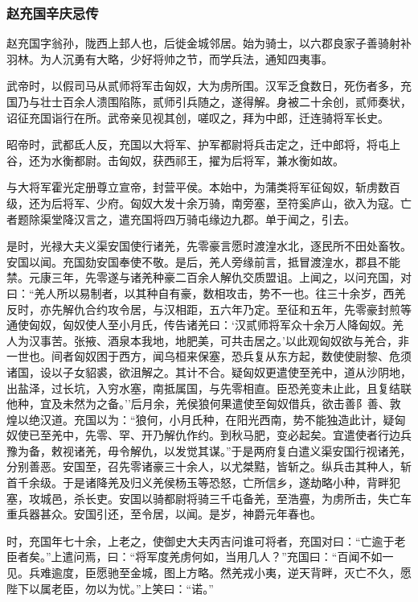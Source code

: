 \documentclass[]{article}
\begin{document}
\hypertarget{header-n5083}{%
\subsubsection{赵充国辛庆忌传}\label{header-n5083}}

赵充国字翁孙，陇西上邽人也，后徙金城邻居。始为骑士，以六郡良家子善骑射补羽林。为人沉勇有大略，少好将帅之节，而学兵法，通知四夷事。

武帝时，以假司马从贰师将军击匈奴，大为虏所围。汉军乏食数日，死伤者多，充国乃与壮士百余人溃围陷陈，贰师引兵随之，遂得解。身被二十余创，贰师奏状，诏征充国诣行在所。武帝亲见视其创，嗟叹之，拜为中郎，迁连骑将军长史。

昭帝时，武都氐人反，充国以大将军、护军都尉将兵击定之，迁中郎将，将屯上谷，还为水衡都尉。击匈奴，获西祁王，擢为后将军，兼水衡如故。

与大将军霍光定册尊立宣帝，封营平侯。本始中，为蒲类将军征匈奴，斩虏数百级，还为后将军、少府。匈奴大发十余万骑，南旁塞，至符奚庐山，欲入为寇。亡者题除渠堂降汉言之，遣充国将四万骑屯缘边九郡。单于闻之，引去。

是时，光禄大夫义渠安国使行诸羌，先零豪言愿时渡湟水北，逐民所不田处畜牧。安国以闻。充国劾安国奉使不敬。是后，羌人旁缘前言，抵冒渡湟水，郡县不能禁。元康三年，先零遂与诸羌种豪二百余人解仇交质盟诅。上闻之，以问充国，对曰：``羌人所以易制者，以其种自有豪，数相攻击，势不一也。往三十余岁，西羌反时，亦先解仇合约攻令居，与汉相距，五六年乃定。至征和五年，先零豪封煎等通使匈奴，匈奴使人至小月氏，传告诸羌曰：`汉贰师将军众十余万人降匈奴。羌人为汉事苦。张掖、酒泉本我地，地肥美，可共击居之。'以此观匈奴欲与羌合，非一世也。间者匈奴困于西方，闻乌桓来保塞，恐兵复从东方起，数使使尉黎、危须诸国，设以子女貂裘，欲沮解之。其计不合。疑匈奴更遣使至羌中，道从沙阴地，出盐泽，过长坑，入穷水塞，南抵属国，与先零相直。臣恐羌变未止此，且复结联他种，宜及未然为之备。''后月余，羌侯狼何果遣使至匈奴借兵，欲击善阝善、敦煌以绝汉道。充国以为：``狼何，小月氏种，在阳光西南，势不能独造此计，疑匈奴使已至羌中，先零、罕、开乃解仇作约。到秋马肥，变必起矣。宜遣使者行边兵豫为备，敕视诸羌，毋令解仇，以发觉其谋。''于是两府复白遣义渠安国行视诸羌，分别善恶。安国至，召先零诸豪三十余人，以尤桀黠，皆斩之。纵兵击其种人，斩首千余级。于是诸降羌及归义羌侯杨玉等恐怒，亡所信乡，遂劫略小种，背畔犯塞，攻城邑，杀长吏。安国以骑都尉将骑三千屯备羌，至浩亹，为虏所击，失亡车重兵器甚众。安国引还，至令居，以闻。是岁，神爵元年春也。

时，充国年七十余，上老之，使御史大夫丙吉问谁可将者，充国对曰：``亡逾于老臣者矣。''上遣问焉，曰：``将军度羌虏何如，当用几人？''充国曰：``百闻不如一见。兵难逾度，臣愿驰至金城，图上方略。然羌戎小夷，逆天背畔，灭亡不久，愿陛下以属老臣，勿以为忧。''上笑曰：``诺。''
\end{document}
